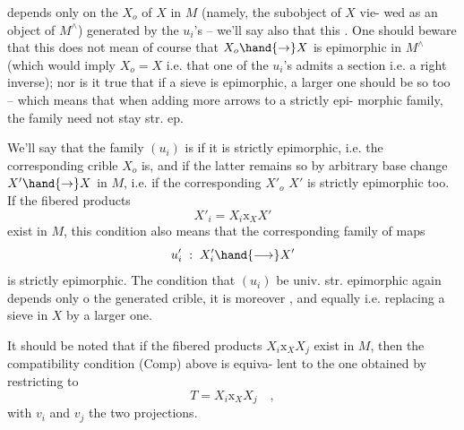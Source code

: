 
depends only on the \hand{\uline{\textcolor{black}{sieve}}} $X_o$ of $X$ in $M$ (namely, the subobject of $X$\hand{,} vie-%
wed as an object of $M^\wedge$) generated by the $u_i$'s -- we'll say also that
this \hand{\uline{\textcolor{black}{sieve}}} \hand{\uline{\textcolor{black}{is strictly epimorphic}}}. One should beware that this does not
mean of course that $X_o \hand{\rightarrow} X$ is epimorphic in $M^\wedge$ (which would imply $X_o=X$
i.e. that one of the $u_i$'s admits a section i.e. a right inverse); nor
is it true that if a sieve is  epimorphic, a larger one should be 
so too -- which means that when adding more arrows to a strictly epi-%
morphic family, the family need  not stay str. ep.

We'll say that the family $(u_i)$ is \hand{\uline{\textcolor{black}{universally}}} \hand{\uline{\textcolor{black}{strictly}}} \hand{\uline{\textcolor{black}{epimorphic}}}
if it is strictly epimorphic, i.e. the corresponding crible $X_o$ is, and
if the latter remains so by arbitrary base change $X' \hand{\rightarrow} X$ in $M$, i.e.
if the corresponding   $X'_o$  $X'$ is strictly epimorphic too. If the
fibered products 
\[ X'_i = X_i \mathrm{x}_X X' \]
exist in $M$, this condition also means that the corresponding family
of maps
\[ u'_i \; : \; X'_i \hand{\longrightarrow} X' \]
is strictly epimorphic. The condition  that $(u_i)$ be  univ. str.
epimorphic again depends only o the generated crible, it is moreover
\hand{\uline{\textcolor{black}{stable under base change}}}, and equally \hand{\uline{\textcolor{black}{stable under adding new arrows}}}
i.e. replacing a sieve in $X$ by a larger one.

It should be noted that if the fibered products  $X_i \mathrm{x}_X X_j$
exist in $M$, then the compatibility condition (Comp) above is equiva-%
lent to the one obtained by restricting to 
\[ T = X_i \mathrm{x}_X X_j \quad , \]
with $v_i$ and $v_j$ the two projections.

